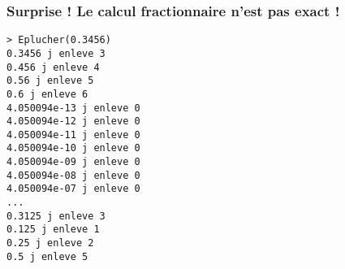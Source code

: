 \documentclass[10pt]{beamer}
\begin{document}
\begin{frame}[fragile]
  \frametitle{Surprise ! Le calcul fractionnaire n'est pas exact !}
\begin{lstlisting}
> Eplucher(0.3456)
0.3456 j enleve 3 
0.456 j enleve 4 
0.56 j enleve 5 
0.6 j enleve 6 
4.050094e-13 j enleve 0 
4.050094e-12 j enleve 0 
4.050094e-11 j enleve 0 
4.050094e-10 j enleve 0 
4.050094e-09 j enleve 0 
4.050094e-08 j enleve 0 
4.050094e-07 j enleve 0 
...
0.3125 j enleve 3 
0.125 j enleve 1 
0.25 j enleve 2 
0.5 j enleve 5  
\end{lstlisting}
\end{frame}

 \questionSlide

 \appendix
 \backupSlides





\end{document}
